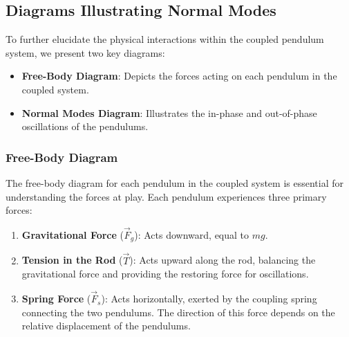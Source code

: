 \documentclass[12pt]{report} %
\begin{document}
\subsection{Diagrams Illustrating Normal Modes}
\label{subsec:part1_task5_diagrams}

To further elucidate the physical interactions within the coupled pendulum system, we present two key diagrams:

\begin{itemize}
    \item \textbf{Free-Body Diagram}: Depicts the forces acting on each pendulum in the coupled system.
    \item \textbf{Normal Modes Diagram}: Illustrates the in-phase and out-of-phase oscillations of the pendulums.
\end{itemize}

\subsubsection{Free-Body Diagram}
\label{subsubsec:part1_task5_fbd}

The free-body diagram for each pendulum in the coupled system is essential for understanding the forces at play. Each pendulum experiences three primary forces:

\begin{enumerate}
    \item \textbf{Gravitational Force} (\( \vec{F}_g \)): Acts downward, equal to \( mg \).
    \item \textbf{Tension in the Rod} (\( \vec{T} \)): Acts upward along the rod, balancing the gravitational force and providing the restoring force for oscillations.
    \item \textbf{Spring Force} (\( \vec{F}_s \)): Acts horizontally, exerted by the coupling spring connecting the two pendulums. The direction of this force depends on the relative displacement of the pendulums.
\end{enumerate}
\end{document}
